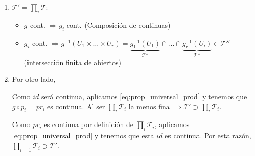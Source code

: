 \begin{demo}
\begin{enumerate}
    \item $\mathcal{T}' = \prod_{i} \mathcal{T}: $ 
    \begin{itemize}
        \item $g$ cont. $\Rightarrow g_i$ cont. (Composición de continuas)
        \item $g_i$ cont. $\Rightarrow g^{-1}\left( U_1 \times \ldots \times U_r \right) = \underbrace{g_1^{-1}\left( U_1 \right)}_{\mathcal{T}''} \cap \ldots \cap \underbrace{g_r^{-1}\left( U_i \right)}_{\mathcal{T}''} \in \mathcal{T}''$ (intersección finita de abiertos) 
    \end{itemize}

    \item Por otro lado,

    \begin{figure}[H]
        \centering    
    \end{figure}
    Como $id$ será continua, aplicamos \ref{eq:prop_universal_prod} y tenemos que $g \circ p_i = pr_i$ es continua. Al ser $\prod_{i} \mathcal{T}_i $ la menos fina $\Rightarrow \mathcal{T}' \supset \prod_{i} \mathcal{T}_i$.

    \begin{figure}[H]
        \centering    
    \end{figure}
    Como $pr_i$ es continua por definición de $\prod_{i} \mathcal{T}_i$, aplicamos \ref{eq:prop_universal_prod} y tenemos que esta $id$ es continua. Por esta razón, $\prod_{i=1} \mathcal{T}_i \supset \mathcal{T}'$.
\end{enumerate}
\end{demo}

